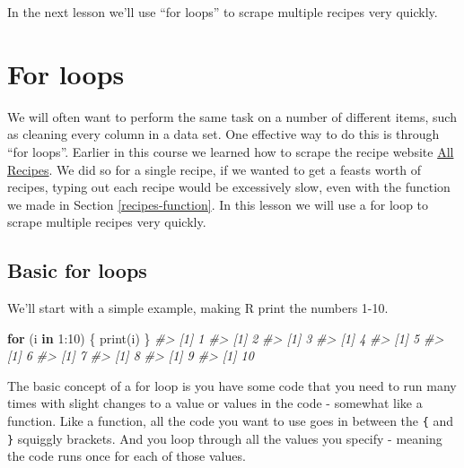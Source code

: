 \documentclass[
  12pt,
  openany]{book}
\newenvironment{Shaded}{\begin{snugshade}}{\end{snugshade}}
\newcommand{\CommentTok}[1]{\textcolor[rgb]{0.37,0.37,0.37}{\textit{#1}}}
\newcommand{\ControlFlowTok}[1]{\textcolor[rgb]{0.27,0.27,0.27}{\textbf{#1}}}
\newcommand{\DecValTok}[1]{\textcolor[rgb]{0.06,0.06,0.06}{#1}}
\newcommand{\FunctionTok}[1]{\textcolor[rgb]{0,0,0}{#1}}
\newcommand{\NormalTok}[1]{#1}
\newcommand{\SpecialCharTok}[1]{\textcolor[rgb]{0,0,0}{#1}}
\begin{document}
In the next lesson we'll use ``for loops'' to scrape multiple recipes very quickly.

\hypertarget{for-loops}{%
\chapter{For loops}\label{for-loops}}

We will often want to perform the same task on a number of different items, such as cleaning every column in a data set. One effective way to do this is through ``for loops''. Earlier in this course we learned how to scrape the recipe website \href{https://www.allrecipes.com/}{All Recipes}. We did so for a single recipe, if we wanted to get a feasts worth of recipes, typing out each recipe would be excessively slow, even with the function we made in Section \ref{recipes-function}. In this lesson we will use a for loop to scrape multiple recipes very quickly.

\hypertarget{basic-for-loops}{%
\section{Basic for loops}\label{basic-for-loops}}

We'll start with a simple example, making R print the numbers 1-10.

\begin{Shaded}
\begin{Highlighting}[]
\ControlFlowTok{for}\NormalTok{ (i }\ControlFlowTok{in} \DecValTok{1}\SpecialCharTok{:}\DecValTok{10}\NormalTok{) \{}
   \FunctionTok{print}\NormalTok{(i)}
\NormalTok{\}}
\CommentTok{\#\textgreater{} [1] 1}
\CommentTok{\#\textgreater{} [1] 2}
\CommentTok{\#\textgreater{} [1] 3}
\CommentTok{\#\textgreater{} [1] 4}
\CommentTok{\#\textgreater{} [1] 5}
\CommentTok{\#\textgreater{} [1] 6}
\CommentTok{\#\textgreater{} [1] 7}
\CommentTok{\#\textgreater{} [1] 8}
\CommentTok{\#\textgreater{} [1] 9}
\CommentTok{\#\textgreater{} [1] 10}
\end{Highlighting}
\end{Shaded}

The basic concept of a for loop is you have some code that you need to run many times with slight changes to a value or values in the code - somewhat like a function. Like a function, all the code you want to use goes in between the \texttt{\{} and \texttt{\}} squiggly brackets. And you loop through all the values you specify - meaning the code runs once for each of those values.
\end{document}
